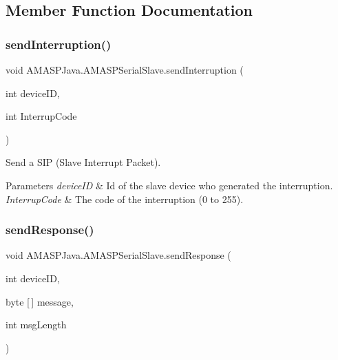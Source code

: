 \subsection{Member Function Documentation}
\mbox{\label{class_a_m_a_s_p_java_1_1_a_m_a_s_p_serial_slave_aa6185a4c4745e701c2eee36dbc577a99}} 
\subsubsection{\texorpdfstring{send\+Interruption()}{sendInterruption()}}
{\footnotesize\ttfamily void A\+M\+A\+S\+P\+Java.\+A\+M\+A\+S\+P\+Serial\+Slave.\+send\+Interruption (\begin{DoxyParamCaption}\item[{int}]{device\+ID,  }\item[{int}]{Interrup\+Code }\end{DoxyParamCaption})}

Send a S\+IP (Slave Interrupt Packet). 
\begin{DoxyParams}{Parameters}
{\em device\+ID} & Id of the slave device who generated the interruption. \\
\hline
{\em Interrup\+Code} & The code of the interruption (0 to 255). \\
\hline
\end{DoxyParams}
\mbox{\label{class_a_m_a_s_p_java_1_1_a_m_a_s_p_serial_slave_ac1a33dcf4cc36f5e98b6a212125152f1}} 
\subsubsection{\texorpdfstring{send\+Response()}{sendResponse()}\hspace{0.1cm}{\footnotesize\ttfamily [1/2]}}
{\footnotesize\ttfamily void A\+M\+A\+S\+P\+Java.\+A\+M\+A\+S\+P\+Serial\+Slave.\+send\+Response (\begin{DoxyParamCaption}\item[{int}]{device\+ID,  }\item[{byte \mbox{[}$\,$\mbox{]}}]{message,  }\item[{int}]{msg\+Length }\end{DoxyParamCaption})}

